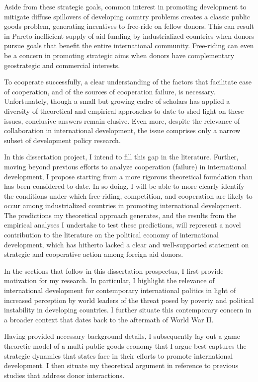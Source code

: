 \documentclass[12pt,]{article}
\begin{document}
Aside from these strategic goals, common interest in promoting
development to mitigate diffuse spillovers of developing country
problems creates a classic public goods problem, generating incentives
to free-ride on fellow donors. This can result in Pareto inefficient
supply of aid funding by industrialized countries when donors pursue
goals that benefit the entire international community. Free-riding can
even be a concern in promoting strategic aims when donors have
complementary geostrategic and commercial interests.

To cooperate successfully, a clear understanding of the factors that
facilitate ease of cooperation, and of the sources of cooperation
failure, is necessary. Unfortunately, though a small but growing cadre
of scholars has applied a diversity of theoretical and empirical
approaches to-date to shed light on these issues, conclusive answers
remain elusive. Even more, despite the relevance of collaboration in
international development, the issue comprises only a narrow subset of
development policy research.

In this dissertation project, I intend to fill this gap in the
literature. Further, moving beyond previous efforts to analyze
cooperation (failure) in international development, I propose starting
from a more rigorous theoretical foundation than has been considered
to-date. In so doing, I will be able to more clearly identify the
conditions under which free-riding, competition, and cooperation are
likely to occur among industrialized countries in promoting
international development. The predictions my theoretical approach
generates, and the results from the empirical analyses I undertake to
test these predictions, will represent a novel contribution to the
literature on the political economy of international development, which
has hitherto lacked a clear and well-supported statement on strategic
and cooperative action among foreign aid donors.

In the sections that follow in this dissertation prospectus, I first
provide motivation for my research. In particular, I highlight the
relevance of international development for contemporary international
politics in light of increased perception by world leaders of the threat
posed by poverty and political instability in developing countries. I
further situate this contemporary concern in a broader context that
dates back to the aftermath of World War II.

Having provided necessary background details, I subsequently lay out a
game theoretic model of a multi-public goods economy that I argue best
captures the strategic dynamics that states face in their efforts to
promote international development. I then situate my theoretical
argument in reference to previous studies that address donor
interactions.
\end{document}
